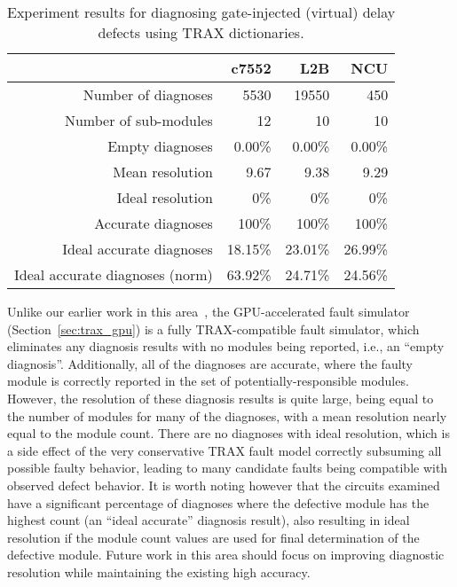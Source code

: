\begin{table}[hbtp]
\center
\begin{tabular*}{0.8\columnwidth}{@{\extracolsep{\fill}}rrrr}
\toprule
                                &c7552      &L2B        &NCU\\
\midrule
Number of diagnoses             &5530       &19550      &450\\
Number of sub-modules           &12         &10         &10\\
Empty diagnoses                 &0.00\%     &0.00\%     &0.00\%\\
Mean resolution                 &9.67       &9.38       &9.29\\
Ideal resolution                &0\%        &0\%        &0\%\\
Accurate diagnoses              &100\%      &100\%      &100\%\\
Ideal accurate diagnoses        &18.15\%    &23.01\%    &26.99\%\\
\midrule
Ideal accurate diagnoses (norm) &63.92\%    &24.71\%    &24.56\%\\
\bottomrule
\end{tabular*}
\caption{Experiment results for diagnosing gate-injected (virtual) delay defects using TRAX dictionaries.}
\label{table:diag_exp_results_trax}
\end{table}

Unlike our earlier work in this area~\cite{beckler12}, the GPU-accelerated fault simulator (Section~\ref{sec:trax_gpu}) is a fully TRAX-compatible fault simulator, which eliminates any diagnosis results with no modules being reported, i.e., an ``empty diagnosis''.
%
Additionally, all of the diagnoses are accurate, where the faulty module is correctly reported in the set of potentially-responsible modules.
%
However, the resolution of these diagnosis results is quite large, being equal to the number of modules for many of the diagnoses, with a mean resolution nearly equal to the module count.
%
There are no diagnoses with ideal resolution, which is a side effect of the very conservative TRAX fault model correctly subsuming all possible faulty behavior, leading to many candidate faults being compatible with observed defect behavior.
%
It is worth noting however that the circuits examined have a significant percentage of diagnoses where the defective module has the highest count (an ``ideal accurate'' diagnosis result), also resulting in ideal resolution if the module count values are used for final determination of the defective module.
%
Future work in this area should focus on improving diagnostic resolution while maintaining the existing high accuracy.


